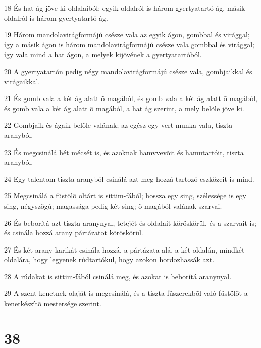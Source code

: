 \par 18 És hat ág jöve ki oldalaiból; egyik oldalról is három gyertyatartó-ág, másik oldalról is három gyertyatartó-ág.
\par 19 Három mandolavirágformájú csésze vala az egyik ágon, gombbal és virággal; így a másik ágon is három mandolavirágformájú csésze vala gombbal és virággal; így vala mind a hat ágon, a melyek kijövének a gyertyatartóból.
\par 20 A gyertyatartón pedig négy mandolavirágformájú csésze vala, gombjaikkal és virágaikkal.
\par 21 És gomb vala a két ág alatt õ magából, és gomb vala a két ág alatt õ magából, és gomb vala a két ág alatt õ magából, a hat ág szerint, a mely belõle jöve ki.
\par 22 Gombjaik és ágaik belõle valának; az egész egy vert munka vala, tiszta aranyból.
\par 23 És megcsinálá hét mécsét is, és azoknak hamvvevõit és hamutartóit, tiszta aranyból.
\par 24 Egy talentom tiszta aranyból csinálá azt meg hozzá tartozó eszközeit is mind.
\par 25 Megcsinálá a füstölõ oltárt is sittim-fából; hossza egy sing, szélessége is egy sing, négyszögû; magassága pedig két sing; õ magából valának szarvai.
\par 26 És beborítá azt tiszta aranynyal, tetejét és oldalait köröskörül, és a szarvait is; és csinála hozzá arany pártázatot köröskörül.
\par 27 És két arany karikát csinála hozzá, a pártázata alá, a két oldalán, mindkét oldalára, hogy legyenek rúdtartókul, hogy azokon hordozhassák azt.
\par 28 A rúdakat is sittim-fából csinálá meg, és azokat is beborítá aranynyal.
\par 29 A szent kenetnek olaját is megcsinálá, és a tiszta fûszerekbõl való füstölõt a kenetkészítõ mestersége szerint.

\chapter{38}

